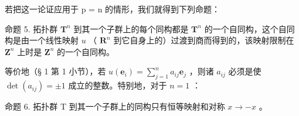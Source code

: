 若把这一论证应用于 p = n 的情形，我们就得到下列命题：

命题 5. 拓扑群 \(\mathbf{T}^n\) 到其一个子群上的每个同构都是 \(\mathbf{T}^n\) 的一个自同构，这个自同构是由一个线性映射 \(u\) （ \(\mathbf{R}^n\) 到它自身上的）过渡到商而得到的，该映射限制在 \(\mathbf{Z}^n\) 上时是 \(\mathbf{Z}^n\) 的一个自同构。

等价地（§ 1 第 1 小节），若 \(u(\boldsymbol{e}_i) = \sum_{j=1}^{n} a_{ij} \boldsymbol{e}_j\) ，则诸 \(a_{ij}\) 必须是使 \(\det(a_{ij}) = \pm 1\) 成立的整数。特别地，对于 \(n = 1\) ：

命题 6. 拓扑群 T 到其一个子群上的同构只有恒等映射和对称 \(x \to -x\) 。

